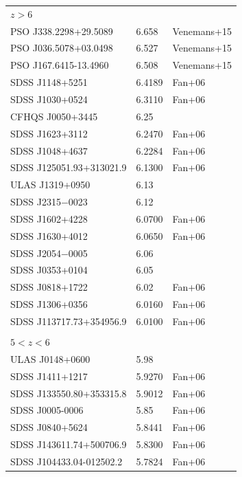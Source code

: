 \documentclass[useAMS,usenatbib,twocolumn]{mn2e}
\begin{document}
\begin{table}
\begin{tabular}{lll}
\hline
$z>6$            &      \\
PSO J338.2298+29.5089             &  6.658        & Venemans+15 \\
PSO J036.5078+03.0498             &  6.527        & Venemans+15 \\
PSO J167.6415-13.4960             &  6.508        & Venemans+15 \\
SDSS J1148+5251                   &  6.4189       & Fan+06  \\
SDSS J1030+0524                   &  6.3110       & Fan+06  \\
CFHQS J0050+3445                  & 6.25 \\
SDSS J1623+3112                   &  6.2470       & Fan+06  \\
SDSS J1048+4637                   &  6.2284       & Fan+06  \\
SDSS J125051.93+313021.9          &  6.1300       & Fan+06  \\
ULAS J1319+0950                   & 6.13 \\
SDSS J2315−0023                   & 6.12 \\
SDSS J1602+4228                   &  6.0700       & Fan+06  \\
SDSS J1630+4012                   &  6.0650       & Fan+06  \\
SDSS J2054−0005                   & 6.06 \\
SDSS J0353+0104                   & 6.05 \\
SDSS J0818+1722                   & 6.02         & Fan+06  \\
SDSS J1306+0356                   &  6.0160       & Fan+06  \\
SDSS J113717.73+354956.9          &  6.0100       & Fan+06  \\
\\
$5<z<6$ \\
ULAS J0148+0600                   & 5.98 \\
SDSS J1411+1217                   &  5.9270       & Fan+06  \\
SDSS J133550.80+353315.8          &  5.9012       & Fan+06  \\
SDSS J0005-0006                   &  5.85         & Fan+06  \\    
SDSS J0840+5624                   &  5.8441       & Fan+06  \\
SDSS J143611.74+500706.9          &  5.8300       & Fan+06  \\
SDSS J104433.04-012502.2          &  5.7824       & Fan+06  \\

\end{tabular}
\end{table}
\end{document}

